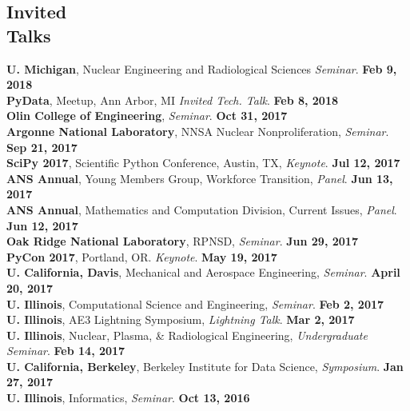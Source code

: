 \documentclass[margin,line]{resume}
\begin{document}
\begin{resume}
    \section{\mysidestyle Invited\\Talks}
      \textbf{U. Michigan}, Nuclear Engineering and Radiological Sciences \emph{Seminar}.  \hfill\textbf{Feb 9, 2018}\\
      \textbf{PyData}, Meetup, Ann Arbor, MI \emph{Invited Tech. Talk}.  \hfill\textbf{Feb 8, 2018}\\
      \textbf{Olin College of Engineering}, \emph{Seminar}.  \hfill\textbf{Oct 31, 2017}\\
      \textbf{Argonne National Laboratory}, NNSA Nuclear Nonproliferation, \emph{Seminar}.  \hfill\textbf{Sep 21, 2017}\\
      \textbf{SciPy 2017}, Scientific Python Conference, Austin, TX, \emph{Keynote}.  \hfill\textbf{Jul 12, 2017}\\
      \textbf{ANS Annual}, Young Members Group, Workforce Transition, \emph{Panel}.  \hfill\textbf{Jun 13, 2017}\\
      \textbf{ANS Annual}, Mathematics and Computation Division, Current Issues, \emph{Panel}.  \hfill\textbf{Jun 12, 2017}\\
      \textbf{Oak Ridge National Laboratory}, RPNSD, \emph{Seminar}.  \hfill\textbf{Jun 29, 2017}\\
      \textbf{PyCon 2017}, Portland, OR. \emph{Keynote}.  \hfill\textbf{May 19, 2017}\\
      \textbf{U. California, Davis}, Mechanical and Aerospace Engineering, \emph{Seminar}.  \hfill\textbf{April 20, 2017}\\
      \textbf{U. Illinois}, Computational Science and Engineering, \emph{Seminar}.  \hfill\textbf{Feb 2, 2017}\\
      \textbf{U. Illinois}, AE3 Lightning Symposium, \emph{Lightning Talk}.  \hfill\textbf{Mar 2, 2017}\\
      \textbf{U. Illinois}, Nuclear, Plasma, \& Radiological Engineering, \emph{Undergraduate Seminar}.  \hfill\textbf{Feb 14, 2017}\\
      \textbf{U. California, Berkeley}, Berkeley Institute for Data Science, \emph{Symposium}.  \hfill\textbf{Jan 27, 2017}\\
      \textbf{U. Illinois}, Informatics, \emph{Seminar}.  \hfill\textbf{Oct 13, 2016}\\

\end{resume}
\end{document}
